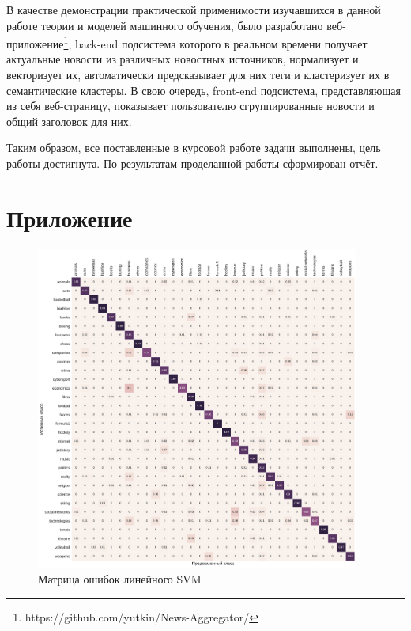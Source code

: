 \documentclass[a4paper, 14pt]{extarticle}
\begin{document}
В качестве демонстрации практической применимости изучавшихся в данной работе теории и моделей машинного обучения,
было разработано веб-приложение\footnote{https://github.com/yutkin/News-Aggregator/}, back-end подсистема которого в реальном времени
получает актуальные новости из различных новостных источников, нормализует и векторизует их, автоматически предсказывает для них
теги и кластеризует их в семантические кластеры. В свою очередь, front-end подсистема, представляющая из себя веб-страницу,
показывает пользователю сгруппированные новости и общий заголовок для них.

Таким образом, все поставленные в курсовой работе задачи выполнены, цель работы достигнута. По результатам проделанной работы сформирован
отчёт.


\setcounter{secnumdepth}{0}
\section{Приложение}
\begin{figure}[h!]
	\centering
	\includegraphics[width=0.95\textwidth]{svm_confusion_matrix.pdf}
	\caption{Матрица ошибок линейного SVM}
	\label{svm_confusion}
\end{figure}
\end{document}
